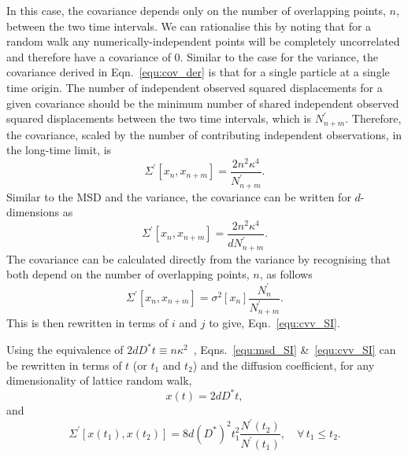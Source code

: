 \documentclass[reprint,superscriptaddress,nobibnotes,amsmath,amssymb,aps,prx,hidelinks,linenumbers]{revtex4-2}
\newcommand{\oMSDs}[1]{\ensuremath{x}(#1)}
\newcommand{\oMSDn}{\ensuremath{x_n}}
\newcommand{\oMSDm}{\ensuremath{x_{n + m}}}
\newcommand{\nind}[1]{\ensuremath{N^\prime_{#1}}}
\newcommand{\D}{\ensuremath{D^*}}
\newcommand{\var}[1]{\ensuremath{\sigma^2[#1]}}
\begin{document}
In this case, the covariance depends only on the number of overlapping points, $n$, between the two time intervals. 
We can rationalise this by noting that for a random walk any numerically-independent points will be completely uncorrelated and therefore have a covariance of \num{0}. 
Similar to the case for the variance, the covariance derived in Eqn.~\ref{equ:cov_der} is that for a single particle at a single time origin. 
The number of independent observed squared displacements for a given covariance should be the minimum number of shared independent observed squared displacements between the two time intervals, which is $\nind{n+m}$. 
Therefore, the covariance, scaled by the number of contributing independent observations, in the long-time limit, is
\begin{equation}
    \Sigma^\prime \left[\oMSDn, \oMSDm \right] = \frac{2n^2\kappa^4}{\nind{n+m}}.
\end{equation}
Similar to the MSD and the variance, the covariance can be written for $d$-dimensions as 
\begin{equation}
    \Sigma^\prime \left[\oMSDn, \oMSDm \right] = \frac{2n^2\kappa^4}{d\nind{n+m}}.
\end{equation}
The covariance can be calculated directly from the variance by recognising that both depend on the number of overlapping points, $n$, as follows
\begin{equation}
    \Sigma^\prime \left[\oMSDn, \oMSDm \right] = \var{\oMSDn}\frac{\nind{n}}{\nind{n+m}}.
\end{equation}
This is then rewritten in terms of $i$ and $j$ to give, Eqn.~\ref{equ:cvv_SI}.

Using the equivalence of $2d\D t \equiv n\kappa^2$~\cite{howard_reports_1964}, Eqns.~\ref{equ:msd_SI} \&~\ref{equ:cvv_SI} can be rewritten in terms of $t$ (or $t_1$ and $t_2$) and the diffusion coefficient, for any dimensionality of lattice random walk,
\begin{equation}
    \oMSDs{t} = 2d \D t,
    \label{equ:der_msd_fick}
\end{equation}
and 
\begin{equation}
    \Sigma^\prime \left[\oMSDs{t_1}, \oMSDs{t_2} \right] = 8d{(\D)}^2 t_1^2\frac{N^\prime(t_2)}{N^\prime(t_1)},\hspace{1em} \forall\,t_1 \leq t_2.
\end{equation}
\end{document}
